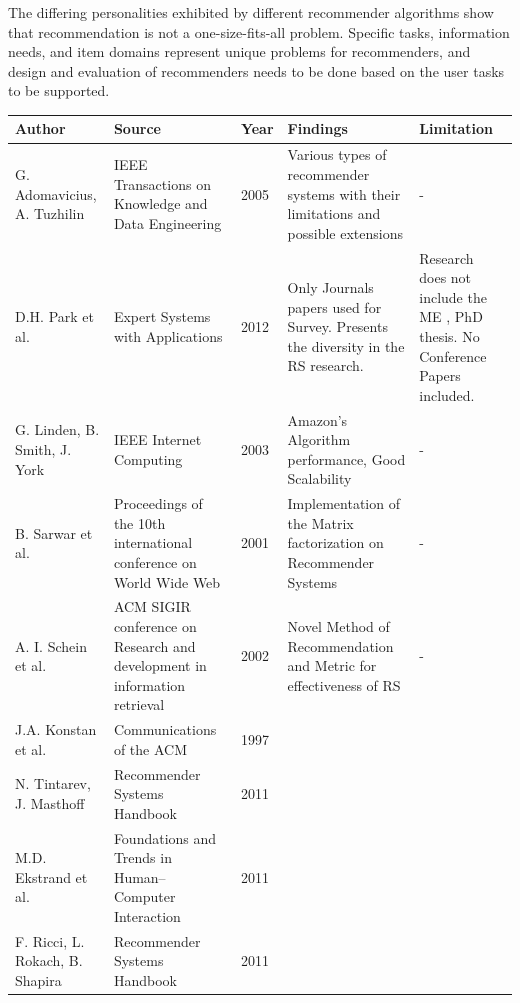 \documentclass[12pt,a4paper]{article}
\begin{document}
	\cite{ekstrand2011collaborative} The differing personalities exhibited by different recommender algorithms show that recommendation is not a one-size-fits-all problem. Specific tasks, information needs, and item domains
	represent unique problems for recommenders, and design and evaluation of recommenders needs to be done based on the user tasks to be supported.\\
	
	
	
	\begin{center}
		\begin{tabular}{ |p{3cm}|p{3cm}|p{0.8cm}|p{4cm}|p{2cm}| }
			\hline
			Author & Source & Year & Findings & Limitation\\
			\hline
			G. Adomavicius, A. Tuzhilin & IEEE Transactions on Knowledge and Data Engineering & 2005 & Various types of recommender systems with their limitations and possible extensions & -\\
			\hline
			D.H. Park et al. & Expert Systems with Applications & 2012 & Only Journals papers used for Survey. Presents the diversity in the RS research. & Research does not include the ME , PhD thesis. No Conference Papers included.\\
			\hline
			G. Linden, B. Smith, J. York & IEEE Internet Computing & 2003 & Amazon's Algorithm performance, Good Scalability & -\\
			\hline
			B. Sarwar et al. & Proceedings of the 10th international conference on World Wide Web & 2001 & Implementation of the Matrix factorization on Recommender Systems & -\\
			\hline
			A. I. Schein et al. & ACM SIGIR conference on Research and development in information retrieval & 2002 & Novel Method of Recommendation and Metric for effectiveness of RS & -\\
			 \hline
			J.A. Konstan et al. & Communications of the ACM & 1997 &  &\\
			 \hline
			N. Tintarev, J. Masthoff & Recommender Systems Handbook & 2011 &  &\\
			 \hline
			M.D. Ekstrand et al. & Foundations and Trends{\textregistered} in Human--Computer Interaction & 2011 &  &\\
			 \hline
			F. Ricci, L. Rokach, B. Shapira & Recommender Systems Handbook & 2011 &  &\\
			\hline
		\end{tabular}
	\end{center}
	
\end{document}
